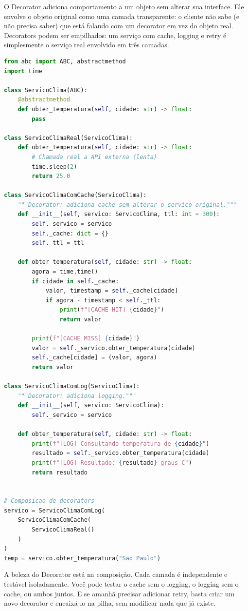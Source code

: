 O Decorator adiciona comportamento a um objeto sem alterar sua interface.
Ele envolve o objeto original como uma camada transparente: o cliente não
sabe (e não precisa saber) que está falando com um decorator em vez do
objeto real. Decorators podem ser empilhados: um serviço com cache, logging
e retry é simplesmente o serviço real envolvido em três camadas.

\begin{lstlisting}[language=Python, caption={Decorator Pattern em Python}]
from abc import ABC, abstractmethod
import time

class ServicoClima(ABC):
    @abstractmethod
    def obter_temperatura(self, cidade: str) -> float:
        pass

class ServicoClimaReal(ServicoClima):
    def obter_temperatura(self, cidade: str) -> float:
        # Chamada real a API externa (lenta)
        time.sleep(2)
        return 25.0

class ServicoClimaComCache(ServicoClima):
    """Decorator: adiciona cache sem alterar o servico original."""
    def __init__(self, servico: ServicoClima, ttl: int = 300):
        self._servico = servico
        self._cache: dict = {}
        self._ttl = ttl

    def obter_temperatura(self, cidade: str) -> float:
        agora = time.time()
        if cidade in self._cache:
            valor, timestamp = self._cache[cidade]
            if agora - timestamp < self._ttl:
                print(f"[CACHE HIT] {cidade}")
                return valor

        print(f"[CACHE MISS] {cidade}")
        valor = self._servico.obter_temperatura(cidade)
        self._cache[cidade] = (valor, agora)
        return valor

class ServicoClimaComLog(ServicoClima):
    """Decorator: adiciona logging."""
    def __init__(self, servico: ServicoClima):
        self._servico = servico

    def obter_temperatura(self, cidade: str) -> float:
        print(f"[LOG] Consultando temperatura de {cidade}")
        resultado = self._servico.obter_temperatura(cidade)
        print(f"[LOG] Resultado: {resultado} graus C")
        return resultado


# Composicao de decorators
servico = ServicoClimaComLog(
    ServicoClimaComCache(
        ServicoClimaReal()
    )
)
temp = servico.obter_temperatura("Sao Paulo")
\end{lstlisting}

A beleza do Decorator está na composição. Cada camada é independente e
testável isoladamente. Você pode testar o cache sem o logging, o logging sem
o cache, ou ambos juntos. E se amanhã precisar adicionar retry, basta criar
um novo decorator e encaixá-lo na pilha, sem modificar nada que já existe.

